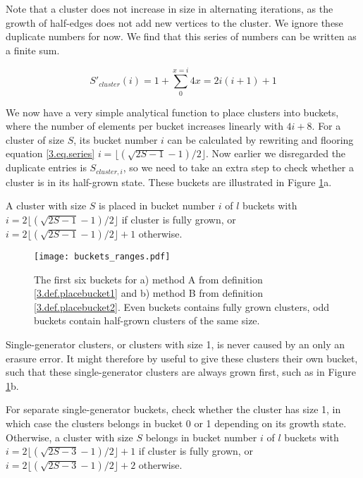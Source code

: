 Note that a cluster does not increase in size in alternating iterations, as the growth of half-edges does not add new vertices to the cluster. We ignore these duplicate numbers for now. We find that this series of numbers can be written as a finite sum.

\begin{equation}\label{3.eq.series}
  S'_{cluster}(i) = 1 + \sum_{0}^{x=i} 4x = 2i(i+1) + 1
\end{equation}

We now have a very simple analytical function to place clusters into buckets, where the number of elements per bucket increases linearly with $4i + 8$. For a cluster of size $S$, its bucket number $i$ can be calculated by rewriting and flooring equation \ref{3.eq.series} $i=\lfloor (\sqrt{2S-1} - 1)/2 \rfloor$. Now earlier we disregarded the duplicate entries is $S_{cluster, i}$, so we need to take an extra step to check whether a cluster is in its half-grown state. These buckets are illustrated in Figure \ref{3.fig.bucketsranges}a.

\begin{definition}\label{3.def.placebucket1}
  A cluster with size $S$ is placed in bucket number $i$ of $l$ buckets with $i=2\lfloor (\sqrt{2S-1} - 1)/2 \rfloor$ if cluster is fully grown, or $i=2\lfloor (\sqrt{2S-1} - 1)/2 \rfloor + 1$ otherwise.
\end{definition}

\begin{figure}[htpb]
  \centering
  \texttt{[image: buckets\_ranges.pdf]}
  \caption{The first six buckets for a) method A from definition \ref{3.def.placebucket1} and b) method B from definition \ref{3.def.placebucket2}. Even buckets contains fully grown clusters, odd buckets contain half-grown clusters of the same size.}\label{3.fig.bucketsranges}
\end{figure}

Single-generator clusters, or clusters with size 1, is never caused by an only an erasure error. It might therefore by useful to give these clusters their own bucket, such that these single-generator clusters are always grown first, such as in Figure \ref{3.fig.bucketsranges}b.

\begin{definition}\label{3.def.placebucket2}
  For separate single-generator buckets, check whether the cluster has size 1, in which case the clusters belongs in bucket 0 or 1 depending on its growth state. Otherwise, a cluster with size $S$ belongs in bucket number $i$ of $l$ buckets with $i=2\lfloor (\sqrt{2S-3} - 1)/2 \rfloor + 1$ if cluster is fully grown, or $i=2\lfloor (\sqrt{2S-3} - 1)/2 \rfloor + 2$ otherwise.
\end{definition}

